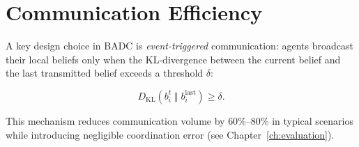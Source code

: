 \section{Communication Efficiency}

A key design choice in BADC is \emph{event-triggered} communication: agents
broadcast their local beliefs only when the KL-divergence between the current
belief and the last transmitted belief exceeds a threshold $\delta$:

\begin{equation}
  D_{\mathrm{KL}}(b_i^t \;\Vert\; b_i^{\text{last}}) \geq \delta.
  \label{eq:trigger}
\end{equation}

This mechanism reduces communication volume by $60\%$--$80\%$ in typical
scenarios while introducing negligible coordination error (see
Chapter~\ref{ch:evaluation}).

